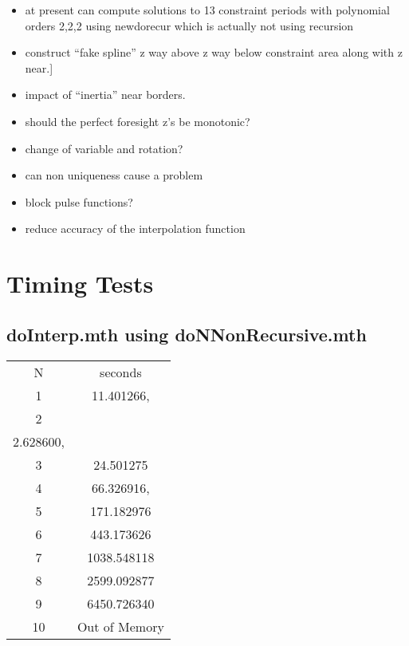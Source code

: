 \documentclass[12pt]{article}
\begin{document}
\begin{itemize}
\item at present can compute solutions to 13 constraint periods with  polynomial orders  2,2,2 using newdorecur which is actually not using recursion
\item construct ``fake spline'' z way above z way below constraint area along with z near.]
\item impact of ``inertia'' near borders.
\item should the perfect foresight z's be monotonic?
\item change of variable and rotation?
\item can non uniqueness cause a problem
\item block pulse functions?
\item reduce accuracy of the interpolation function
\end{itemize}

\section{Timing Tests}
\label{sec:timing-tests}

\subsection{doInterp.mth using doNNonRecursive.mth}
\label{sec:doint-using-donn}

\begin{tabular}{|c|c|}
N&seconds\\
1&11.401266,\\
2\\2.628600,\\
3&24.501275\\
4&66.326916,\\
5&171.182976\\
6&443.173626\\
7&1038.548118\\
8&2599.092877\\
9&6450.726340\\
10&Out of Memory
\end{tabular}




\end{document}
